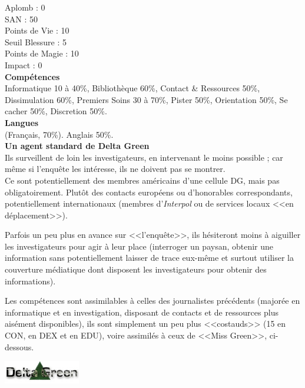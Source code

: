 \documentclass[11pt,twoside,a4paper]{article}
\begin{document}
\begin{multicols}{2}
	 Aplomb : 0~\\
	 SAN : 50~\\
	 Points de Vie : 10~\\
	 Seuil Blessure : 5~\\
	 Points de Magie : 10~\\
	 Impact :  0~\\

	\textbf{Comp{\'e}tences}~\\
		Informatique 10 {\`a} 40\%, 
		Biblioth{\`e}que 60\%, 
		Contact \& Ressources 50\%, 
		Dissimulation 60\%, 
		Premiers Soins 30 {\`a} 70\%, 
		Pister 50\%, 
		Orientation 50\%, 
		Se cacher 50\%, 
		Discretion 50\%. ~\\

	\textbf{Langues}~\\
	(Fran\c{c}ais, 70\%). Anglais 50\%. ~\\


	\textbf{\large Un agent standard de Delta Green}~\\
	Ils surveillent de loin les investigateurs, en intervenant le moins possible ; car m{\^e}me si l'enqu{\^e}te les int{\'e}resse, ils ne doivent pas se montrer. ~\\
	
	Ce sont potentiellement des membres am{\'e}ricains d'une cellule DG, mais pas obligatoirement. Plut{\^o}t des contacts europ{\'e}ens ou d'honorables correspondants, potentiellement internationaux (membres d'\emph{Interpol} ou de services locaux <<en d{\'e}placement>>). 
	
	Parfois un peu plus en avance sur <<l'enqu{\^e}te>>, ils h{\'e}siteront moins {\`a} aiguiller les investigateurs pour agir {\`a} leur place (interroger un paysan, obtenir une information sans potentiellement laisser de trace eux-m{\^e}me et surtout utiliser la couverture m{\'e}diatique dont disposent les investigateurs pour obtenir des informations). 

	Les comp{\'e}tences sont assimilables {\`a} celles des journalistes pr{\'e}c{\'e}dents (major{\'e}e en informatique et en investigation, disposant de contacts et de ressources plus ais{\'e}ment disponibles), ils sont simplement un peu plus <<costauds>> (15 en CON, en DEX et en EDU), voire assimil{\'e}s {\`a} ceux de <<Miss Green>>, ci-dessous. ~\\

\begin{center} \includegraphics[width=0.25\textwidth]{logo_DG.jpg} \end{center}


\end{multicols}
\end{document}
